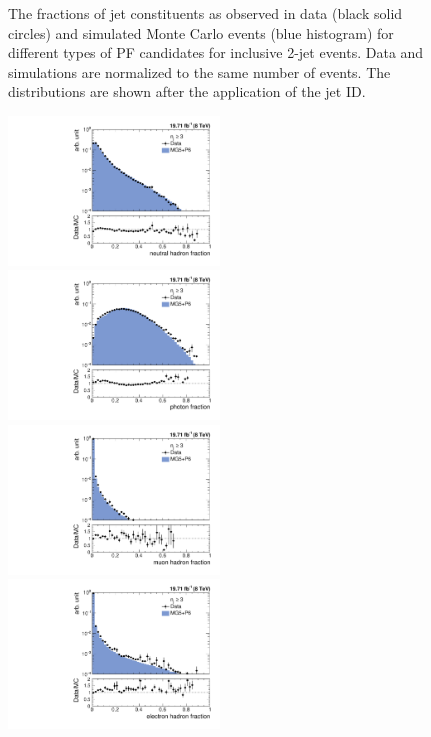 \begin{figure}[!htbp]
\begin{center}
 \caption{The fractions of jet constituents as observed in data (black solid circles) and simulated Monte Carlo events (blue histogram) for different types of PF candidates for inclusive 2-jet events. Data and simulations are normalized to the same number of events. The distributions are shown after the application of the jet ID.}
 \label{fig:qual2}
 \end{center}
\end{figure} 

\begin{figure}[!htbp]
 \begin{center}
 \includegraphics[width=0.5\textwidth]{Plots_HT_2_150/Comparison_NuHadFrac_3_HT_2_150.pdf}%
 ~~\includegraphics[width=0.5\textwidth]{Plots_HT_2_150/Comparison_PhFrac_3_HT_2_150.pdf}\\
 \includegraphics[width=0.5\textwidth]{Plots_HT_2_150/Comparison_MuFrac_3_HT_2_150.pdf}%
 ~~\includegraphics[width=0.5\textwidth]{Plots_HT_2_150/Comparison_ElFrac_3_HT_2_150.pdf}\\

\end{center}
\end{figure}
